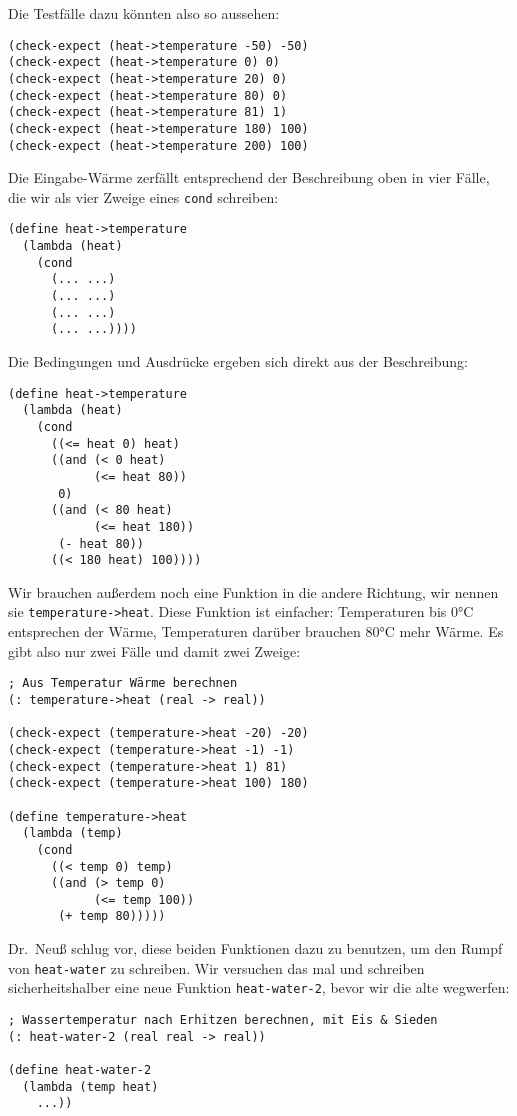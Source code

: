 Die Testfälle dazu könnten also so aussehen:
%
\begin{lstlisting}
(check-expect (heat->temperature -50) -50)
(check-expect (heat->temperature 0) 0)
(check-expect (heat->temperature 20) 0)
(check-expect (heat->temperature 80) 0)
(check-expect (heat->temperature 81) 1)
(check-expect (heat->temperature 180) 100)
(check-expect (heat->temperature 200) 100)                                            
\end{lstlisting}
%
Die Eingabe-Wärme zerfällt entsprechend der Beschreibung oben in vier
Fälle, die wir als vier Zweige eines \lstinline{cond} schreiben:
%
\begin{lstlisting}
(define heat->temperature
  (lambda (heat)
    (cond
      (... ...)
      (... ...)
      (... ...)
      (... ...))))
\end{lstlisting}
%
Die Bedingungen und Ausdrücke ergeben sich direkt aus der Beschreibung:
%
\begin{lstlisting}
(define heat->temperature
  (lambda (heat)
    (cond
      ((<= heat 0) heat)
      ((and (< 0 heat)
            (<= heat 80))
       0)
      ((and (< 80 heat)
            (<= heat 180))
       (- heat 80))
      ((< 180 heat) 100))))
\end{lstlisting}
%
Wir brauchen außerdem noch eine Funktion in die andere Richtung, wir
nennen sie \lstinline{temperature->heat}. Diese Funktion ist einfacher:
Temperaturen bis 0\si{\degree}C entsprechen der Wärme, Temperaturen darüber
brauchen 80\si{\degree}C mehr Wärme.  Es gibt also nur zwei Fälle und damit zwei
Zweige:
%
\begin{lstlisting}
; Aus Temperatur Wärme berechnen
(: temperature->heat (real -> real))

(check-expect (temperature->heat -20) -20)
(check-expect (temperature->heat -1) -1)
(check-expect (temperature->heat 1) 81)
(check-expect (temperature->heat 100) 180)

(define temperature->heat
  (lambda (temp)
    (cond
      ((< temp 0) temp)
      ((and (> temp 0)
            (<= temp 100))
       (+ temp 80)))))
\end{lstlisting}
%
Dr.\ Neuß schlug vor, diese beiden Funktionen dazu zu benutzen, um den
Rumpf von \lstinline{heat-water} zu schreiben.  Wir versuchen das mal
und schreiben sicherheitshalber eine neue Funktion
\lstinline{heat-water-2}, bevor wir die alte wegwerfen:
%
\begin{lstlisting}
; Wassertemperatur nach Erhitzen berechnen, mit Eis & Sieden
(: heat-water-2 (real real -> real))

(define heat-water-2
  (lambda (temp heat)
    ...))
\end{lstlisting}
